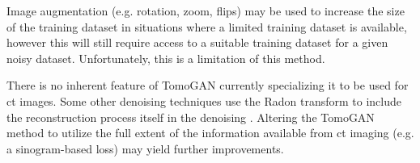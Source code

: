 Image augmentation (e.g. rotation, zoom, flips) may be used to increase the size of the training dataset in situations where a limited training dataset is available, however this will still require access to a suitable training dataset for a given noisy dataset. Unfortunately, this is a limitation of this method. 

There is no inherent feature of TomoGAN currently specializing it to be used for \gls{ct} images. Some other denoising techniques use the Radon transform to include the reconstruction process itself in the denoising \cite{GANrec,HAGGSTROM2019253}. Altering the TomoGAN method to utilize the full extent of the information available from \gls{ct} imaging (e.g. a sinogram-based loss) may yield further improvements. 